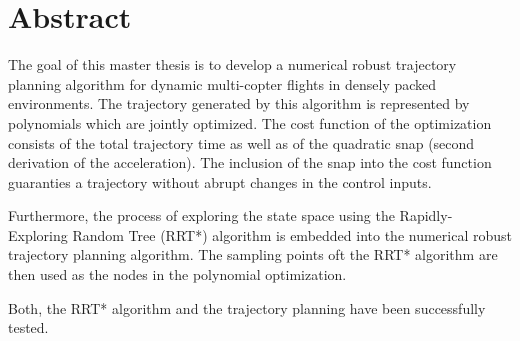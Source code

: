 




 \setcounter{tocdepth}{2}
 \tableofcontents

 \cleardoublepage







\chapter*{Abstract}

The goal of this master thesis is to develop a numerical robust trajectory planning algorithm for dynamic multi-copter flights in densely packed environments. The trajectory generated by this algorithm is represented by polynomials which are jointly optimized. The cost function of the optimization consists of the total trajectory time as well as of the quadratic snap (second derivation of the acceleration). The inclusion of the snap into the cost function guaranties a trajectory without abrupt changes in the control inputs. \newline

Furthermore, the process of exploring the state space using the Rapidly-Exploring Random Tree (RRT*) algorithm is embedded into the numerical robust trajectory planning algorithm. The sampling points oft the RRT* algorithm are then used as the nodes in the polynomial optimization.\newline

Both, the RRT* algorithm and the trajectory planning have been successfully tested.


